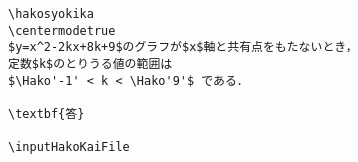 \begin{verbatim}
\hakosyokika
\centermodetrue
$y=x^2-2kx+8k+9$のグラフが$x$軸と共有点をもたないとき，
定数$k$のとりうる値の範囲は
$\Hako'-1' < k < \Hako'9'$ である．

\textbf{答}

\inputHakoKaiFile
\end{verbatim}
